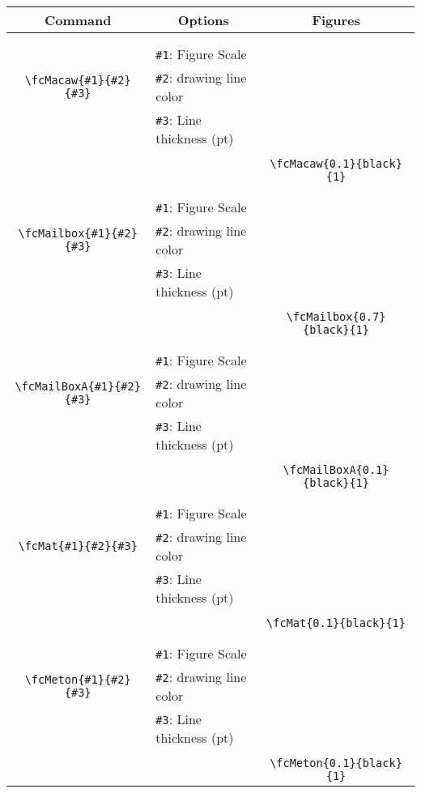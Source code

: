 \documentclass[x11names]{article}
\begin{document}
\begin{table}[H]\centering\begin{tabular}{|c|l|c|}\hline {\bf Command}& \multicolumn{1}{c|}{{\bf Options}} & {\bf Figures}\\  \hline	&&\multirow{5}{*}{\fcMacaw{0.1}{black}{1}}\\	&&\\	&\verb|#1|: Figure Scale &\\	\verb|\fcMacaw{#1}{#2}{#3}|&	\verb|#2|: drawing line color &\\	&\verb|#3|: Line thickness (pt) &\\ &&\\&&	\verb|\fcMacaw{0.1}{black}{1}|\\\hline 	
	&&\multirow{5}{*}{\fcMailbox{0.7}{black}{1}}\\	&&\\	&\verb|#1|: Figure Scale &\\	\verb|\fcMailbox{#1}{#2}{#3}|&	\verb|#2|: drawing line color &\\	&\verb|#3|: Line thickness (pt) &\\ &&\\&&	\verb|\fcMailbox{0.7}{black}{1}|\\\hline 	
	&&\multirow{5}{*}{\fcMailBoxA{0.1}{black}{1}}\\	&&\\	&\verb|#1|: Figure Scale &\\	\verb|\fcMailBoxA{#1}{#2}{#3}|&	\verb|#2|: drawing line color &\\	&\verb|#3|: Line thickness (pt) &\\ &&\\&&	\verb|\fcMailBoxA{0.1}{black}{1}|\\\hline 	
	&&\multirow{5}{*}{\fcMat{0.1}{black}{1}}\\	&&\\	&\verb|#1|: Figure Scale &\\	\verb|\fcMat{#1}{#2}{#3}|&	\verb|#2|: drawing line color &\\	&\verb|#3|: Line thickness (pt) &\\ &&\\&&	\verb|\fcMat{0.1}{black}{1}|\\\hline 	
	&&\multirow{5}{*}{\fcMeton{0.1}{black}{1}}\\	&&\\	&\verb|#1|: Figure Scale &\\	\verb|\fcMeton{#1}{#2}{#3}|&	\verb|#2|: drawing line color &\\	&\verb|#3|: Line thickness (pt) &\\ &&\\&&	\verb|\fcMeton{0.1}{black}{1}|\\\hline 	

\end{tabular}
\end{table}
\end{document}
